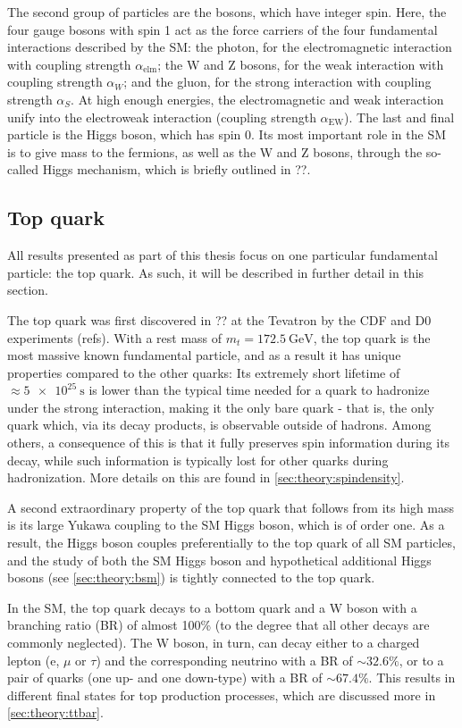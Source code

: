 The second group of particles are the bosons, which have integer spin. Here, the four gauge bosons with spin 1 act as the force carriers of the four fundamental interactions described by the SM: the photon, for the electromagnetic interaction with coupling strength $\alpha_{\mathrm{elm}}$; the W and Z bosons, for the weak interaction with coupling strength $\alpha_W$; and the gluon, for the strong interaction with coupling strength $\alpha_S$. At high enough energies, the electromagnetic and weak interaction unify into the electroweak interaction (coupling strength $\alpha_{\mathrm{EW}}$). The last and final particle is the Higgs boson, which has spin 0. Its most important role in the SM is to give mass to the fermions, as well as the W and Z bosons, through the so-called Higgs mechanism, which is briefly outlined in ??.

\subsection{Top quark}

All results presented as part of this thesis focus on one particular fundamental particle: the top quark. As such, it will be described in further detail in this section.

The top quark was first discovered in ?? at the Tevatron by the CDF and D0 experiments (refs). With a rest mass of $m_t = \SI{172.5}{\GeV}$, the top quark is the most massive known fundamental particle, and as a result it has unique properties compared to the other quarks: Its extremely short lifetime of $\approx \SI{5e25}{\s}$ is lower than the typical time needed for a quark to hadronize under the strong interaction, making it the only bare quark - that is, the only quark which,  via its decay products, is observable outside of hadrons. Among others, a consequence of this is that it fully preserves spin information during its decay, while such information is typically lost for other quarks during hadronization. More details on this are found in \cref{sec:theory:spindensity}.

A second extraordinary property of the top quark that follows from its high mass is its large Yukawa coupling to the SM Higgs boson, which is of order one. As a result, the Higgs boson couples preferentially to the top quark of all SM particles, and the study of both the SM Higgs boson and hypothetical additional Higgs bosons (see \cref{sec:theory:bsm}) is tightly connected to the top quark. 

In the SM, the top quark decays to a bottom quark and a W boson with a branching ratio (BR) of almost 100\% (to the degree that all other decays are commonly neglected). The W boson, in turn, can decay either to a charged lepton (e, $\mu$ or $\tau$) and the corresponding neutrino with a BR of $\sim 32.6\%$, or to a pair of quarks (one up- and one down-type) with a BR of $\sim 67.4\%$. This results in different final states for top production processes, which are discussed more in \cref{sec:theory:ttbar}.

